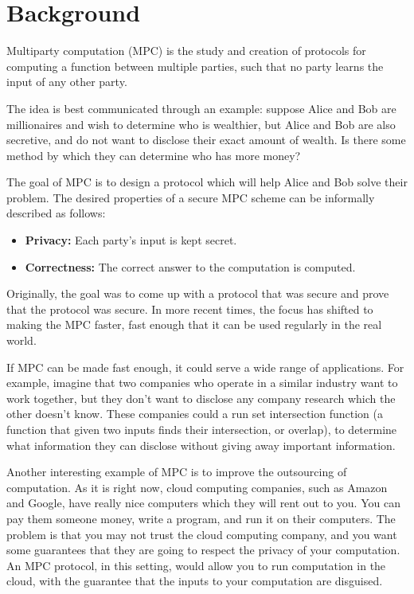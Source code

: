 \chapter{Background}

Multiparty computation (MPC) is the study and creation of protocols for computing a function between multiple parties, such that no party learns the input of any other party.

The idea is best communicated through an example: suppose Alice and Bob are millionaires and wish to determine who is wealthier, but Alice and Bob are also secretive, and do not want to disclose their exact amount of wealth. 
Is there some method by which they can determine who has more money?

The goal of MPC is to design a protocol which will help Alice and Bob solve their problem.
The desired properties of a secure MPC scheme can be informally described as follows:
\begin{itemize}
    \item \textbf{Privacy:} Each party's input is kept secret.
    \item \textbf{Correctness:} The correct answer to the computation is computed.
\end{itemize}

Originally, the goal was to come up with a protocol that was secure and prove that the protocol was secure. 
In more recent times, the focus has shifted to making the MPC faster, fast enough that it can be used regularly in the real world.

If MPC can be made fast enough, it could serve a wide range of applications.
For example, imagine that two companies who operate in a similar industry want to work together, but they don't want to disclose any company research which the other doesn't know.
These companies could a run set intersection function (a function that given two inputs finds their intersection, or overlap), to determine what information they can disclose without giving away important information.

Another interesting example of MPC is to improve the outsourcing of computation.
As it is right now, cloud computing companies, such as Amazon and Google, have really nice computers which they will rent out to you. 
You can pay them someone money, write a program, and run it on their computers. 
The problem is that you may not trust the cloud computing company, and you want some guarantees that they are going to respect the privacy of your computation.
An MPC protocol, in this setting, would allow you to run computation in the cloud, with the guarantee that the inputs to your computation are disguised.

